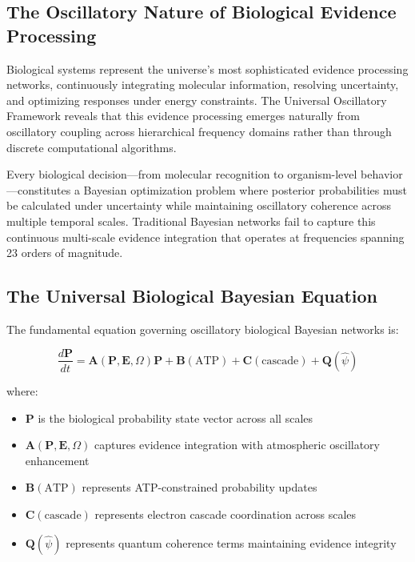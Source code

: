 \documentclass[12pt,a4paper]{article}
\begin{document}
\subsection{The Oscillatory Nature of Biological Evidence Processing}

Biological systems represent the universe's most sophisticated evidence processing networks, continuously integrating molecular information, resolving uncertainty, and optimizing responses under energy constraints. The Universal Oscillatory Framework reveals that this evidence processing emerges naturally from oscillatory coupling across hierarchical frequency domains rather than through discrete computational algorithms.

Every biological decision—from molecular recognition to organism-level behavior—constitutes a Bayesian optimization problem where posterior probabilities must be calculated under uncertainty while maintaining oscillatory coherence across multiple temporal scales. Traditional Bayesian networks fail to capture this continuous multi-scale evidence integration that operates at frequencies spanning 23 orders of magnitude.

\subsection{The Universal Biological Bayesian Equation}

The fundamental equation governing oscillatory biological Bayesian networks is:

\begin{equation}
\frac{d\mathbf{P}}{dt} = \mathbf{A}(\mathbf{P}, \mathbf{E}, \Omega) \mathbf{P} + \mathbf{B}(\text{ATP}) + \mathbf{C}(\text{cascade}) + \mathbf{Q}(\hat{\psi})
\end{equation}

where:
\begin{itemize}
\item $\mathbf{P}$ is the biological probability state vector across all scales
\item $\mathbf{A}(\mathbf{P}, \mathbf{E}, \Omega)$ captures evidence integration with atmospheric oscillatory enhancement
\item $\mathbf{B}(\text{ATP})$ represents ATP-constrained probability updates
\item $\mathbf{C}(\text{cascade})$ represents electron cascade coordination across scales
\item $\mathbf{Q}(\hat{\psi})$ represents quantum coherence terms maintaining evidence integrity
\end{itemize}
\end{document}
